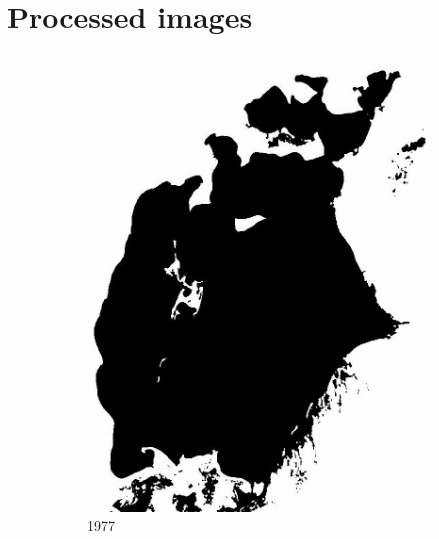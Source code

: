 \documentclass[12pt,a4paper]{article}
\begin{document}
\section{Processed images}

\begin{figure}[H]
    \centering
    \begin{subfigure}[b]{0.19\textwidth}
        \centering
        \includegraphics[width=\textwidth]{../img/1977w.jpg}
        \caption{1977}
    \end{subfigure}
    \begin{subfigure}[b]{0.19\textwidth}
        \centering

\end{subfigure}
\end{figure}
\end{document}
